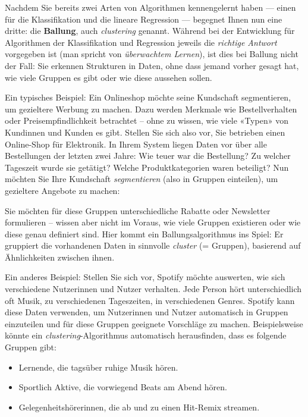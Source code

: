 \begin{lpu}

Nachdem Sie bereits zwei Arten von Algorithmen kennengelernt haben — einen für die Klassifikation und die lineare Regression — begegnet Ihnen nun eine dritte: die \textbf{Ballung}, auch \emph{clustering} genannt. Während bei der Entwicklung für Algorithmen der Klassifikation und Regression jeweils die \emph{richtige Antwort} vorgegeben ist (man spricht von \emph{überwachtem Lernen}), ist dies bei Ballung nicht der Fall: Sie erkennen Strukturen in Daten, ohne dass jemand vorher gesagt hat, wie viele Gruppen es gibt oder wie diese aussehen sollen.

Ein typisches Beispiel: Ein Onlineshop möchte seine Kundschaft segmentieren, um gezieltere Werbung zu machen. Dazu werden Merkmale wie Bestellverhalten oder Preisempfindlichkeit betrachtet – ohne zu wissen, wie viele «Typen» von Kundinnen und Kunden es gibt. Stellen Sie sich also vor, Sie betrieben einen Online-Shop für Elektronik. In Ihrem System liegen Daten vor über alle Bestellungen der letzten zwei Jahre: Wie teuer war die Bestellung? Zu welcher Tageszeit wurde sie getätigt? Welche Produktkategorien waren beteiligt? Nun möchten Sie Ihre Kundschaft \textit{segmentieren} (also in Gruppen einteilen), um gezieltere Angebote zu machen:

Sie möchten für diese Gruppen unterschiedliche Rabatte oder Newsletter formulieren – wissen aber nicht im Voraus, wie viele Gruppen existieren oder wie diese genau definiert sind. Hier kommt ein Ballungsalgorithmus ins Spiel: Er gruppiert die vorhandenen Daten in sinnvolle \textit{cluster} (= Gruppen), basierend auf Ähnlichkeiten zwischen ihnen.

Ein anderes Beispiel: Stellen Sie sich vor, Spotify möchte auswerten, wie sich verschiedene Nutzerinnen und Nutzer verhalten. Jede Person hört unterschiedlich oft Musik, zu verschiedenen Tageszeiten, in verschiedenen Genres. Spotify kann diese Daten verwenden, um Nutzerinnen und Nutzer automatisch in Gruppen einzuteilen und für diese Gruppen geeignete Vorschläge zu machen. Beispielsweise könnte ein \textit{clustering}-Algorithmus automatisch herausfinden, dass es folgende Gruppen gibt:

\begin{itemize}
  \item Lernende, die tagsüber ruhige Musik hören.
  \item Sportlich Aktive, die vorwiegend Beats am Abend hören.
  \item Gelegenheitshörerinnen, die ab und zu einen Hit-Remix streamen.
\end{itemize}


\end{lpu}
